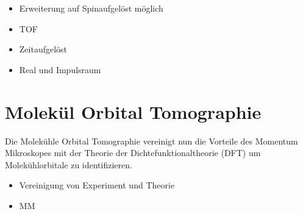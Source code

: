         \begin{itemize}
            \item Erweiterung auf Spinaufgelöst möglich
            \item TOF
            \item Zeitaufgelöst
            \item Real und Impulsraum
        \end{itemize}

    \section{Molekül Orbital Tomographie}
        Die Molekühle Orbital Tomographie vereinigt nun die Vorteile des Momentum Mikroskopes mit der Theorie der Dichtefunktionaltheorie (DFT) um Molekühlorbitale zu identifizieren.
        \begin{itemize}
            \item Vereinigung von Experiment und Theorie
            \item MM
        \end{itemize}

